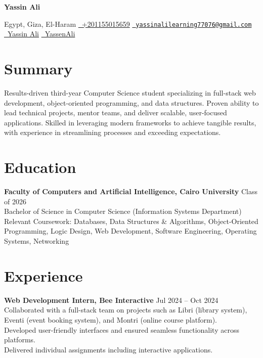 \documentclass[a4paper,10pt]{article}
\begin{document}
\centerline{\Huge \textbf{Yassin Ali}}
\vspace{2mm}
\centerline{
  Egypt, Giza, El-Haram \textbullet{}
  \href{tel:+201155015659}{\faPhone\ +201155015659} \textbullet{}
  \href{mailto:yassinalilearning77076@gmail.com}{\faEnvelope\ \texttt{yassinalilearning77076@gmail.com}} \textbullet{}
  \href{https://www.linkedin.com/in/yassin-ali-10497a252/}{\faLinkedinSquare\ Yassin Ali} \textbullet{}
  \href{https://github.com/YassenAli}{\faGithub\ YassenAli}
}


\section*{Summary}
Results-driven third-year Computer Science student specializing in full-stack web development, object-oriented programming, and data structures. Proven ability to lead technical projects, mentor teams, and deliver scalable, user-focused applications. Skilled in leveraging modern frameworks to achieve tangible results, with experience in streamlining processes and exceeding expectations.


\section*{Education}
\textbf{Faculty of Computers and Artificial Intelligence, Cairo University} \hfill Class of 2026 \\
Bachelor of Science in Computer Science (Information Systems Department) \\
Relevant Coursework: Databases, Data Structures \& Algorithms, Object-Oriented Programming, Logic Design, Web Development, Software Engineering, Operating Systems, Networking


\section*{Experience}
\textbf{Web Development Intern, Bee Interactive} \hfill Jul 2024 -- Oct 2024 \\
\textbullet{}\hspace{2mm} Collaborated with a full-stack team on projects such as Libri (library system), Eventi (event booking system), and Montri (online course platform).  \\
\textbullet{}\hspace{2mm} Developed user-friendly interfaces and ensured seamless functionality across platforms.  \\
\textbullet{}\hspace{2mm} Delivered individual assignments including interactive applications.
\end{document}
